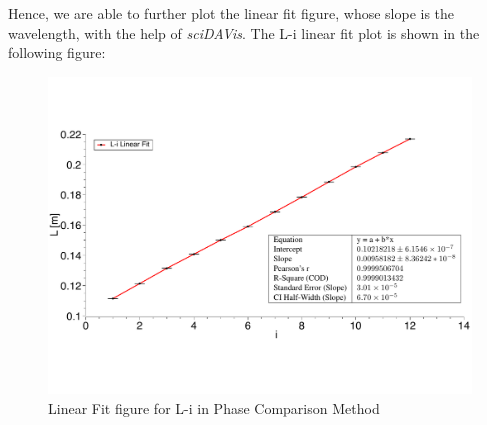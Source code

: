 \documentclass[a4paper,12pt]{article}
\begin{document}
Hence, we are able to further plot the linear fit figure, whose slope is the wavelength, with the help of \textit{sciDAVis}. The L-i linear fit plot is shown in the following figure:

\begin{figure}[h] 
    \centering
    \includegraphics[width=1.04\textwidth]{Fig8_2} 
    \caption{Linear Fit figure for L-i in Phase Comparison Method} 
\end{figure}

\newpage
\end{document}
